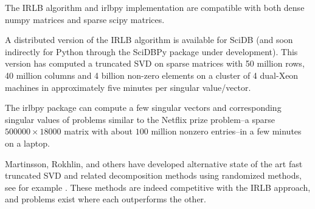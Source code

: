 \documentclass[landscape,a0b,final]{a0poster}
\newenvironment{poster}{
  \begin{center}
  \begin{minipage}[c]{0.98\textwidth}
}{
  \end{minipage} 
  \end{center}
}
\newcommand{\pbox}[4]{
\psshadowbox[#3]{
\begin{minipage}[t][#2][t]{#1}
#4
\end{minipage}
}}
\begin{document}
\begin{poster}
\begin{multicols}{3}
\vspace{0.75cm}

The IRLB algorithm and irlbpy implementation are compatible with 
both dense numpy matrices and sparse scipy matrices.

\vspace{0.75cm}

A distributed version of the IRLB algorithm is available
for SciDB \cite{scidb} (and soon indirectly for Python through the
SciDBPy package under development). This version has computed a truncated SVD
on sparse matrices with 50 million rows, 40 million columns and
4 billion non-zero elements on a cluster of 4 dual-Xeon machines
in approximately five minutes per singular value/vector.

\vspace{0.75cm}

The irlbpy package can compute a few singular vectors and
corresponding singular values of problems similar to the Netflix
prize problem--a sparse $500000\times18000$ matrix with about $100$ million nonzero entries--in a few minutes on a laptop.

\vspace{0.75cm}

Martinsson, Rokhlin, and others have developed alternative state of the art
fast truncated SVD and related decomposition methods using randomized methods,
see for example \cite{Liberty2007}.  These methods are indeed competitive with
the IRLB approach, and problems exist where each outperforms the other.




\end{multicols}

\vspace{1in}

\begin{multicols}{3}

\vspace{2cm}\begin{center}\pbox{0.8\columnwidth}{}{linewidth=1mm,framearc=0.1,fillstyle=gradient,gradangle=0,gradbegin=white,gradend=white,gradmidpoint=1.0,framesep=1em}{\begin{center}\bf{Dense Matrix Comparison}\end{center}}\end{center}\vspace{1.25cm}

\vspace{-1.25cm}


\end{multicols}
\end{poster}
\end{document}
